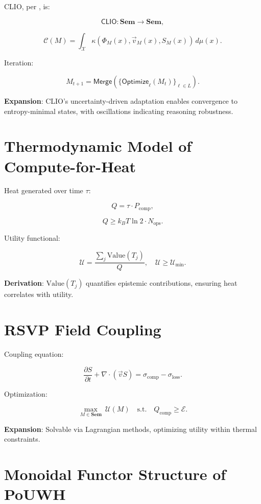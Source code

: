 \documentclass[12pt]{article}
\begin{document}
CLIO, per \citet{ChengBroadbentChappell2025}, is:

\[ \mathsf{CLIO}: \mathbf{Sem} \to \mathbf{Sem}, \]

\[ \mathcal{C}(M) = \int_{\mathcal{X}} \kappa(\Phi_M(x), \vec{v}_M(x), S_M(x)) \, d\mu(x). \]

Iteration:

\[ M_{t+1} = \mathsf{Merge}(\{ \mathsf{Optimize}_\ell(M_t) \}_{\ell \in L}). \]

\textbf{Expansion}: CLIO’s uncertainty-driven adaptation enables convergence to entropy-minimal states, with oscillations indicating reasoning robustness.

\section{Thermodynamic Model of Compute-for-Heat}
\label{app:thermo-model}

Heat generated over time $ \tau $:

\[ Q = \tau \cdot P_{\text{comp}}, \]

\[ Q \geq k_B T \ln 2 \cdot N_{\text{ops}}. \]

Utility functional:

\[ \mathcal{U} = \frac{\sum_{j} \mathrm{Value}(T_j)}{Q}, \quad \mathcal{U} \geq \mathcal{U}_{\text{min}}. \]

\textbf{Derivation}: $ \mathrm{Value}(T_j) $ quantifies epistemic contributions, ensuring heat correlates with utility.

\section{RSVP Field Coupling}
\label{app:rsvp-coupling}

Coupling equation:

\[ \frac{\partial S}{\partial t} + \nabla \cdot (\vec{v} S) = \sigma_{\text{comp}} - \sigma_{\text{loss}}. \]

Optimization:

\[ \max_{M \in \mathbf{Sem}} \ \mathcal{U}(M) \quad \text{s.t.} \quad Q_{\text{comp}} \geq \mathcal{E}. \]

\textbf{Expansion}: Solvable via Lagrangian methods, optimizing utility within thermal constraints.

\section{Monoidal Functor Structure of PoUWH}
\label{app:monoidal-pouwh}
\end{document}
